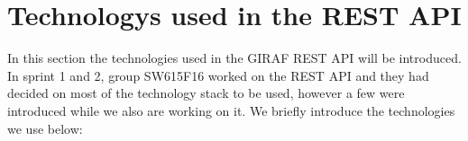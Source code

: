 

\section{Technologys used in the REST API}\label{sec:techstack}
In this section the technologies used in the GIRAF REST API will be introduced.
In sprint 1 and 2, group SW615F16 worked on the REST API and they had decided on most of the technology stack to be used, however a few were introduced while we also are working on it. 
We briefly introduce the technologies we use below:
